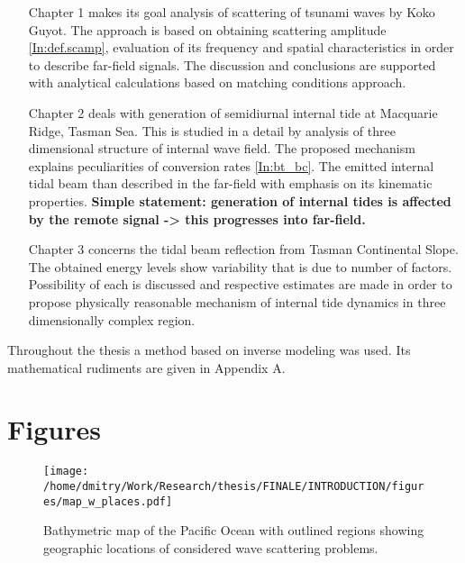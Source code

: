 \documentclass[12pt]{article}
\begin{document}
\begin{enumerate}
	\item[Chapter 1] makes its goal analysis of scattering of tsunami waves by Koko Guyot. The 
	approach is based on obtaining scattering amplitude \eqref{In:def.scamp}, evaluation of its 
	frequency and spatial characteristics in order to describe far-field signals. The discussion 
	and conclusions are supported with analytical calculations based on matching conditions 
	approach.
	\item[Chapter 2] deals with generation of semidiurnal internal tide at Macquarie Ridge,  
	Tasman Sea. This is studied in a detail by analysis of three dimensional structure of 
	internal wave field. The proposed mechanism explains peculiarities of conversion rates 
	\eqref{In:bt_bc}. The emitted internal tidal beam than described in the far-field with emphasis 
	on its kinematic properties.
\textbf{Simple statement: generation of internal tides is affected by the remote signal -> 
this progresses into far-field.}
	\item[Chapter 3] concerns the tidal beam reflection from Tasman Continental Slope. The 
	obtained energy levels show variability that is due to number of factors. Possibility of each 
	is discussed and respective estimates are made in order to propose physically reasonable 
	mechanism of internal tide dynamics in three dimensionally complex region.

\end{enumerate}
Throughout the thesis a method based on inverse modeling was used. Its mathematical rudiments are 
given in Appendix A.

\section*{Figures}
\begin{figure}
	\texttt{[image: /home/dmitry/Work/Research/thesis/FINALE/INTRODUCTION/figures/map\_w\_places.pdf]}
	\caption{Bathymetric map of the Pacific Ocean with outlined regions showing geographic 
	locations of considered wave scattering problems.}
\end{figure}
	
\end{document}
